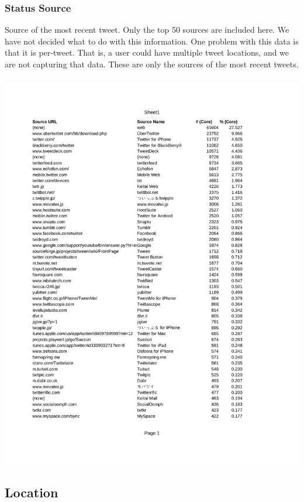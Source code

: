 \subsubsection{Status Source}
Source of the most recent tweet.  Only the top 50 sources are included here.  We have not decided what to do with this information.  One problem with this data is that it is per-tweet.  That is, a user could have multiple tweet locations, and we are not capturing that data.  These are only the sources of the most recent tweets.\\\\
\includegraphics[width=6in,bb=0 0 612 792,keepaspectratio=true]{./sources.pdf}

\twocolumn
\subsection{Location}

